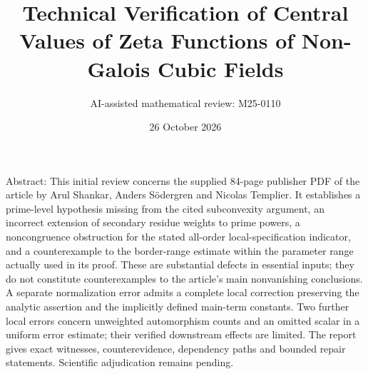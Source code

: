 \documentclass[10pt]{article}
\title{Technical Verification of
Central Values of Zeta Functions of Non-Galois Cubic Fields}
\author{AI-assisted mathematical review: M25-0110}
\date{26 October 2026}
\begin{document}
\maketitle
Abstract: This initial review concerns the supplied 84-page publisher PDF of the article by Arul Shankar, Anders Södergren and Nicolas Templier. It establishes a prime-level hypothesis missing from the cited subconvexity argument, an incorrect extension of secondary residue weights to prime powers, a noncongruence obstruction for the stated all-order local-specification indicator, and a counterexample to the border-range estimate within the parameter range actually used in its proof. These are substantial defects in essential inputs; they do not constitute counterexamples to the article’s main nonvanishing conclusions. A separate normalization error admits a complete local correction preserving the analytic assertion and the implicitly defined main-term constants. Two further local errors concern unweighted automorphism counts and an omitted scalar in a uniform error estimate; their verified downstream effects are limited. The report gives exact witnesses, counterevidence, dependency paths and bounded repair statements. Scientific adjudication remains pending.\par
\end{document}
